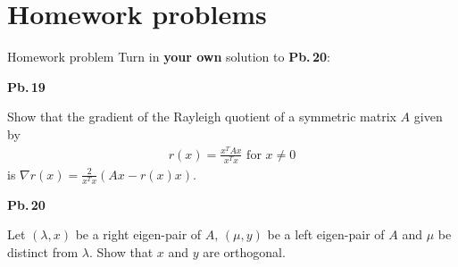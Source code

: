 \documentclass[t,usepdftitle=false]{beamer}
\begin{document}
\begin{comment}
\section{Singular value decomposition\\{\small Section 5.4 in Darve \& Wootters (2021)}}

\begin{frame}{Content}
\begin{itemize}
\item Content
\end{itemize}
\end{frame}
\end{comment}




\section{Homework problems}

\begin{frame}{Homework problem}\vspace{.1cm}
Turn in \textbf{your own} solution to \textbf{Pb.$\,$20}:\vspace{.15cm}\\
\begin{minipage}[t]{0.1\textwidth}
\textbf{Pb.$\,$19}
\end{minipage}
\begin{minipage}[t]{0.89\textwidth}
Show that the gradient of the Rayleigh quotient of a symmetric matrix $A$ given by
\begin{align*}
r(x)=\frac{x^TAx}{x^Tx}\text{ for }x\neq 0
\end{align*}
is $\nabla r(x)=\frac{2}{x^Tx}(Ax-r(x)x)$.
\end{minipage}\vspace{.15cm}
\begin{minipage}[t]{0.1\textwidth}
\textbf{Pb.$\,$20}
\end{minipage}
\begin{minipage}[t]{0.89\textwidth}
Let $(\lambda,x)$ be a right eigen-pair of $A$, $(\mu,y)$ be a left eigen-pair of $A$ and $\mu$ be distinct from $\lambda$. 
Show that $x$ and $y$ are orthogonal.
\end{minipage}\vspace{.15cm}
\end{frame}
\end{document}

